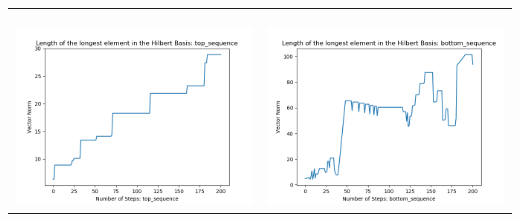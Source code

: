 \documentclass[10pt]{article}
\begin{document}
\begin{tabular}{c|c}
\begin{minipage}{.45\textwidth}
\end{minipage} \\ \\
\hline \\\begin{minipage}{.45\textwidth}
\includegraphics[width=\textwidth]{"DATA/5d/6 generators 2 bound E/top_sequence LENGTH"}
\end{minipage} &
\begin{minipage}{.45\textwidth}
\includegraphics[width=\textwidth]{"DATA/5d/6 generators 2 bound E bottomup/bottom_sequence LENGTH"}
\end{minipage}
\end{tabular}
\end{document}
